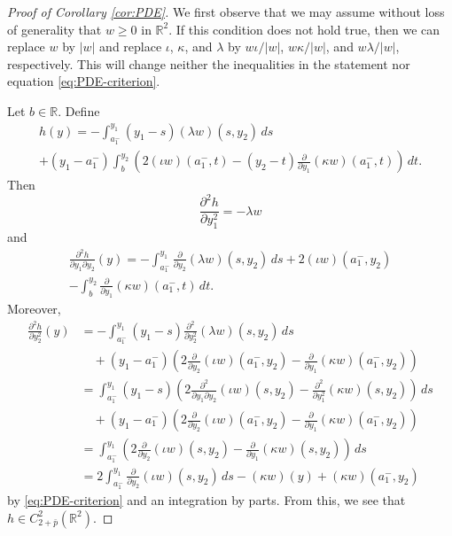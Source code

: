 \documentclass[a4paper]{article}
\newcommand{\R}{\mathbb{R}}
\newcommand{\dd}[2]{\frac{\partial #1}{\partial #2}}
\theoremstyle{definition}
\theoremstyle{remark}
\begin{document}
\begin{proof}[Proof of Corollary \ref{cor:PDE}]
We first observe that we may assume without loss of generality that $w \ge 0$ in $\R^2$. If this
condition does not hold true, then we can replace $w$ by $|w|$ and replace $\iota$, $\kappa$, and $\lambda$
by $w\iota/|w|$, $w\kappa/|w|$, and $w\lambda/|w|$, respectively.
This will change neither the inequalities in the statement nor equation \eqref{eq:PDE-criterion}.

Let $b \in \R$. Define
\begin{multline*}
h(y) = - \int_{a_1^-}^{y_1} (y_1 - s) (\lambda w)(s, y_2) \, ds \\
+ (y_1 - a_1^-) \int_b^{y_2} \left(2(\iota w)(a_1^-, t) - (y_2 - t) \dd{}{y_1}(\kappa w)(a_1^-, t)\right) \, dt.
\end{multline*}
Then
\[
\frac{\partial^2 h}{\partial y_1^2} = - \lambda w
\]
and
\begin{multline*}
\frac{\partial^2 h}{\partial y_1 \partial y_2}(y) = - \int_{a_1^-}^{y_1} \dd{}{y_2}(\lambda w)(s, y_2) \, ds + 2(\iota w)(a_1^-, y_2) \\
- \int_b^{y_2} \dd{}{y_1}(\kappa w)(a_1^-, t) \, dt.
\end{multline*}
Moreover,
\[
\begin{split}
\frac{\partial^2 h}{\partial y_2^2}(y) & = - \int_{a_1^-}^{y_1} (y_1 - s) \frac{\partial^2}{\partial y_2^2}(\lambda w)(s, y_2) \, ds \\
& \quad + (y_1 - a_1^-) \left(2\dd{}{y_2}(\iota w)(a_1^-, y_2) - \dd{}{y_1}(\kappa w)(a_1^-, y_2)\right) \\
& = \int_{a_1^-}^{y_1} (y_1 - s) \left(2\frac{\partial^2}{\partial y_1 \partial y_2}(\iota w)(s, y_2) - \frac{\partial^2}{\partial y_1^2}(\kappa w)(s, y_2)\right) \, ds \\
& \quad + (y_1 - a_1^-) \left(2\dd{}{y_2}(\iota w)(a_1^-, y_2) - \dd{}{y_1}(\kappa w)(a_1^-, y_2)\right) \\
& = \int_{a_1^-}^{y_1} \left(2\dd{}{y_2}(\iota w)(s, y_2) - \dd{}{y_1}(\kappa w)(s, y_2)\right) \, ds \\
& = 2\int_{a_1^-}^{y_1} \dd{}{y_2}(\iota w)(s, y_2) \, ds - (\kappa w)(y) + (\kappa w)(a_1^-, y_2)
\end{split}
\]
by \eqref{eq:PDE-criterion} and an integration by parts.
From this, we see that $h \in C_{2 + \bar{p}}^2(\R^2)$.


\end{proof}
\end{document}
